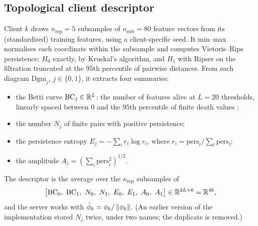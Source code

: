 \subsection{Topological client descriptor}
\label{sec:descriptor}

Client $k$ draws $n_{\mathrm{rep}}=5$ subsamples of $n_{\mathrm{sub}}=80$ feature vectors
from its (standardised) training features, using a client-specific seed. It min--max
normalises each coordinate within the subsample and computes Vietoris--Rips persistence: $H_0$
exactly, by Kruskal's algorithm, and $H_1$ with Ripser \citep{ripser} on the filtration
truncated at the $95$th percentile of pairwise distances. From each diagram
$\mathrm{Dgm}_j$, $j\in\{0,1\}$, it extracts four summaries:
\begin{itemize}[leftmargin=1.2em,itemsep=2pt]
  \item the Betti curve $\mathrm{BC}_j\in\mathbb{R}^{L}$: the number of features alive at $L=20$
    thresholds, linearly spaced between $0$ and the $95$th percentile of finite death
    values \citep{giusti2015clique,chazal2021introduction};
  \item the number $N_j$ of finite pairs with positive persistence;
  \item the persistence entropy \citep{chintakunta2015entropy} $E_j=-\sum_i r_i\log r_i$, where
    $r_i=\mathrm{pers}_i/\sum_l\mathrm{pers}_l$;
  \item the amplitude $A_j=(\sum_i\mathrm{pers}_i^2)^{1/2}$.
\end{itemize}
The descriptor is the average over the $n_{\mathrm{rep}}$ subsamples of
\begin{equation}
  \bigl[\mathrm{BC}_0,\ \mathrm{BC}_1,\ N_0,\ N_1,\ E_0,\ E_1,\ A_0,\ A_1\bigr]\in\R^{2L+6}=\R^{46},
  \label{eq:descriptor}
\end{equation}
and the server works with $\hat\phi_k=\phi_k/\left\lVert \phi_k \right\rVert$. (An earlier version of the
implementation stored $N_j$ twice, under two names; the duplicate is removed.)

